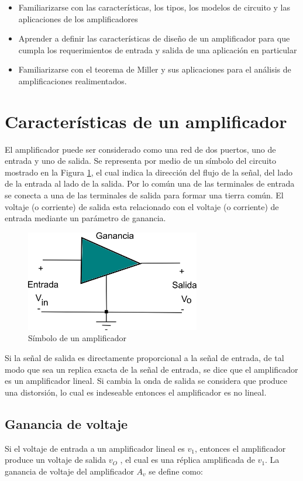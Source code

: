 \documentclass[12pt]{book}
\theoremstyle{definition}
\theoremstyle{remark}
\theoremstyle{plain}
\begin{document}
\begin{itemize}
\item Familiarizarse con las características, los tipos, los modelos de circuito y las aplicaciones de los amplificadores
\item Aprender a definir las características de diseño de un amplificador para que cumpla los requerimientos de entrada y salida de una aplicación en particular
\item Familiarizarse con el teorema de Miller y sus aplicaciones para el análisis de amplificaciones realimentados.
\end{itemize}

\section{Características de un amplificador}
El amplificador puede ser considerado como una red de dos puertos, uno de entrada y uno de salida. Se representa por medio de un símbolo del circuito mostrado en la Figura \ref{fig1}, el cual indica la dirección del flujo de la señal, del lado de la entrada al lado de la salida. Por lo común una de las terminales de entrada se conecta a una de las terminales de salida para formar una tierra común. El voltaje (o corriente) de salida esta relacionado con el voltaje (o corriente) de entrada mediante un parámetro de ganancia.

\begin{figure}
\centering
\includegraphics[width=3in]{Amplificador.png}
\caption{Símbolo de un amplificador}
\label{fig1}
\end{figure}

Si la señal de salida es directamente proporcional a la señal de entrada, de tal modo que sea un replica exacta de la señal de entrada, se dice que el amplificador es un amplificador lineal. Si cambia la onda de salida se considera que produce una distorsión, lo cual es indeseable entonces el amplificador es no lineal.

\subsection{Ganancia de voltaje}
Si el voltaje de entrada a un amplificador lineal es  $v_1$, entonces el amplificador produce un voltaje de salida $v_O$ , el cual es una réplica amplificada de  $v_1$. La ganancia de voltaje del amplificador  $A_v$ se define como:
\end{document}
